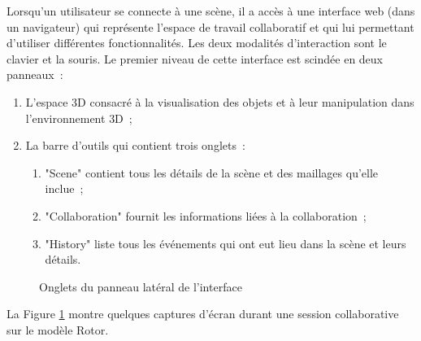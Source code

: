 %	
%	
%	
%	
%	
%	
%	
Lorsqu'un utilisateur se connecte à une scène, il a accès à une interface web 
(dans un navigateur) qui représente l'espace de travail collaboratif et qui lui permettant 
d'utiliser différentes fonctionnalités. Les deux modalités d'interaction sont le clavier 
et la souris. Le premier niveau de cette 
interface est scindée en deux panneaux~: 
\begin{enumerate}
	\item L'espace \gls{3D} consacré à la visualisation des objets et à leur 
	manipulation 
	dans l'environnement \gls{3D}~;
	\item La barre d'outils qui contient trois onglets~:~
	\begin{enumerate}
		\item "Scene" contient tous les détails de la scène et des maillages qu'elle 
		inclue~; 
		\item "Collaboration" fournit les informations liées à la collaboration~;
		\item "History" liste tous les événements qui ont eut lieu dans la scène et 
		leurs  détails. 
	\end{enumerate}
\end{enumerate}

\begin{figure}[ht]
	\centering
	\begingroup
	
	\hfill
	\hfill
	
	\endgroup
	\caption{Onglets du panneau latéral de l'interface}
	\label{fig:uipanneau}
\end{figure}
La Figure \ref{fig:uipanneau} montre quelques captures d'écran durant une 
session collaborative sur le modèle Rotor.

